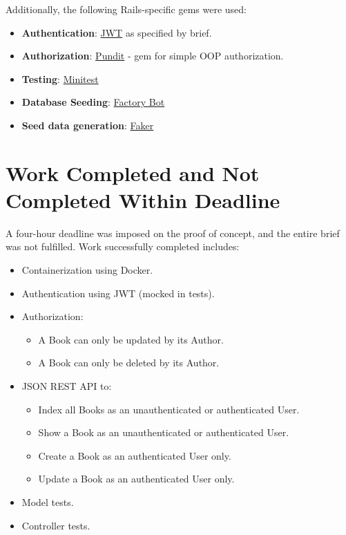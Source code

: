 \documentclass[a4paper]{article}
\begin{document}
Additionally, the following Rails-specific gems were used:

\begin{itemize}
  \item \textbf{Authentication}: \href{https://github.com/jwt/ruby-jwt}{JWT} as specified by brief.
  \item \textbf{Authorization}: \href{https://github.com/varvet/pundit}{Pundit} - gem for simple OOP authorization.
  \item \textbf{Testing}: \href{https://github.com/blowmage/minitest-rails}{Minitest}
  \item \textbf{Database Seeding}: \href{https://github.com/thoughtbot/factory_bot}{Factory Bot}
  \item \textbf{Seed data generation}: \href{https://github.com/faker-ruby/faker}{Faker}
\end{itemize}

\section{Work Completed and Not Completed Within Deadline}
\label{sec:work_completed}

A four-hour deadline was imposed on the proof of concept, and the entire brief
was not fulfilled. Work successfully completed includes:

\begin{itemize}
  \item Containerization using Docker.
  \item Authentication using JWT (mocked in tests).
  \item Authorization:
  \begin{itemize}
    \item A Book can only be updated by its Author.
    \item A Book can only be deleted by its Author.
  \end{itemize}
  \item JSON REST API to:
  \begin{itemize}
    \item Index all Books as an unauthenticated or authenticated User.
    \item Show a Book as an unauthenticated or authenticated User.
    \item Create a Book as an authenticated User only.
    \item Update a Book as an authenticated User only.
  \end{itemize}
  \item Model tests.
  \item Controller tests.
\end{itemize}
\end{document}
